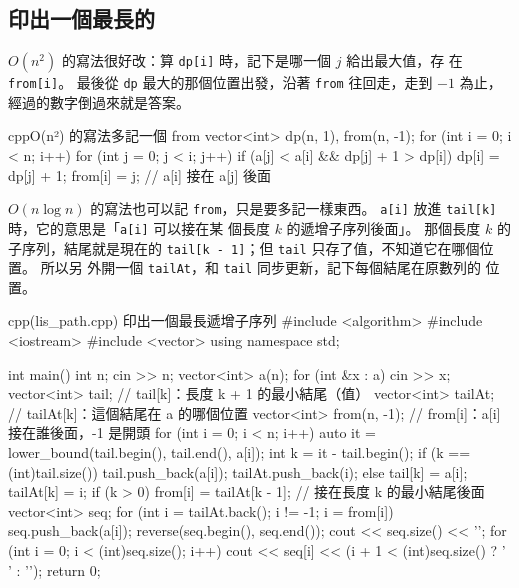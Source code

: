 \subsection{印出一個最長的}
\label{sec:ss-lis-path}

$O(n^2)$ 的寫法很好改：算 \texttt{dp[i]} 時，記下是哪一個 $j$ 給出最大值，存
在 \texttt{from[i]}。 最後從 \texttt{dp} 最大的那個位置出發，沿著
\texttt{from} 往回走，走到 $-1$ 為止，經過的數字倒過來就是答案。

\begin{code}{cpp}{O(n²) 的寫法多記一個 from}
vector<int> dp(n, 1), from(n, -1);
for (int i = 0; i < n; i++) {
    for (int j = 0; j < i; j++) {
        if (a[j] < a[i] && dp[j] + 1 > dp[i]) {
            dp[i] = dp[j] + 1;
            from[i] = j;        // a[i] 接在 a[j] 後面
        }
    }
}
\end{code}

$O(n \log n)$ 的寫法也可以記 \texttt{from}，只是要多記一樣東西。
\texttt{a[i]} 放進 \texttt{tail[k]} 時，它的意思是「\texttt{a[i]} 可以接在某
個長度 $k$ 的遞增子序列後面」。 那個長度 $k$ 的子序列，結尾就是現在的
\texttt{tail[k - 1]}；但 \texttt{tail} 只存了值，不知道它在哪個位置。 所以另
外開一個 \texttt{tailAt}，和 \texttt{tail} 同步更新，記下每個結尾在原數列的
位置。

\begin{example}[label=ex:ss-lis-path]{cpp}{(lis\_path.cpp) 印出一個最長遞增子序列}
#include <algorithm>
#include <iostream>
#include <vector>
using namespace std;

int main() {
    int n;
    cin >> n;
    vector<int> a(n);
    for (int &x : a) {
        cin >> x;
    }
    vector<int> tail;        // tail[k]：長度 k + 1 的最小結尾（值）
    vector<int> tailAt;      // tailAt[k]：這個結尾在 a 的哪個位置
    vector<int> from(n, -1); // from[i]：a[i] 接在誰後面，-1 是開頭
    for (int i = 0; i < n; i++) {
        auto it = lower_bound(tail.begin(), tail.end(), a[i]);
        int k = it - tail.begin();
        if (k == (int)tail.size()) {
            tail.push_back(a[i]);
            tailAt.push_back(i);
        } else {
            tail[k] = a[i];
            tailAt[k] = i;
        }
        if (k > 0) {
            from[i] = tailAt[k - 1];   // 接在長度 k 的最小結尾後面
        }
    }
    vector<int> seq;
    for (int i = tailAt.back(); i != -1; i = from[i]) {
        seq.push_back(a[i]);
    }
    reverse(seq.begin(), seq.end());
    cout << seq.size() << '\n';
    for (int i = 0; i < (int)seq.size(); i++) {
        cout << seq[i] << (i + 1 < (int)seq.size() ? ' ' : '\n');
    }
    return 0;
}
\end{example}

